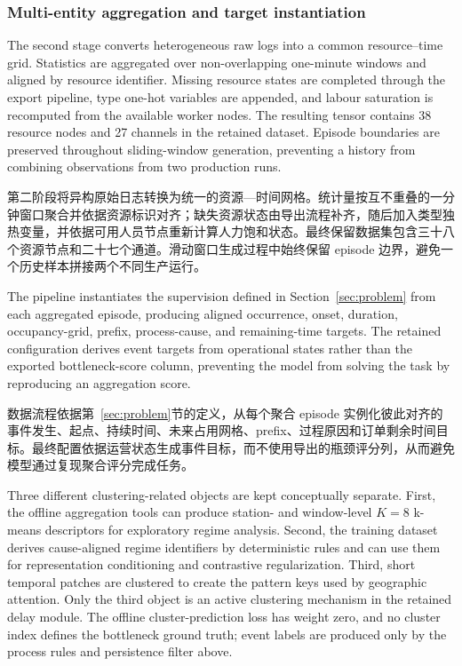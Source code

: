 \documentclass[a4paper,fleqn]{cas-dc}
\newcommand{\zhpara}[1]{%
  \par\begingroup\small\color{black!72}\noindent #1\par\endgroup}
\begin{document}
\subsubsection{Multi-entity aggregation and target instantiation}

The second stage converts heterogeneous raw logs into a common resource--time grid. Statistics are aggregated over non-overlapping one-minute windows and aligned by resource identifier. Missing resource states are completed through the export pipeline, type one-hot variables are appended, and labour saturation is recomputed from the available worker nodes. The resulting tensor contains 38 resource nodes and 27 channels in the retained dataset. Episode boundaries are preserved throughout sliding-window generation, preventing a history from combining observations from two production runs.

\zhpara{第二阶段将异构原始日志转换为统一的资源—时间网格。统计量按互不重叠的一分钟窗口聚合并依据资源标识对齐；缺失资源状态由导出流程补齐，随后加入类型独热变量，并依据可用人员节点重新计算人力饱和状态。最终保留数据集包含三十八个资源节点和二十七个通道。滑动窗口生成过程中始终保留 episode 边界，避免一个历史样本拼接两个不同生产运行。}

The pipeline instantiates the supervision defined in Section~\ref{sec:problem} from each aggregated episode, producing aligned occurrence, onset, duration, occupancy-grid, prefix, process-cause, and remaining-time targets. The retained configuration derives event targets from operational states rather than the exported bottleneck-score column, preventing the model from solving the task by reproducing an aggregation score.

\zhpara{数据流程依据第~\ref{sec:problem}节的定义，从每个聚合 episode 实例化彼此对齐的事件发生、起点、持续时间、未来占用网格、prefix、过程原因和订单剩余时间目标。最终配置依据运营状态生成事件目标，而不使用导出的瓶颈评分列，从而避免模型通过复现聚合评分完成任务。}

Three different clustering-related objects are kept conceptually separate. First, the offline aggregation tools can produce station- and window-level $K=8$ k-means descriptors for exploratory regime analysis. Second, the training dataset derives cause-aligned regime identifiers by deterministic rules and can use them for representation conditioning and contrastive regularization. Third, short temporal patches are clustered to create the pattern keys used by geographic attention. Only the third object is an active clustering mechanism in the retained delay module. The offline cluster-prediction loss has weight zero, and no cluster index defines the bottleneck ground truth; event labels are produced only by the process rules and persistence filter above.
\end{document}

